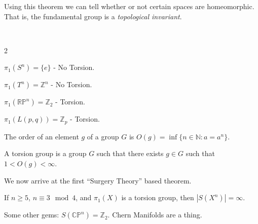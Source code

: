 \documentclass[crop=false,class=book,oneside]{standalone}
\begin{document}
            Using this theorem we can tell whether or not
            certain spaces are homeomorphic. That is,
            the fundamental group is a
            \textit{topological invariant}.
            \begin{example}
                    \
                    \begin{enumerate}
                    \end{enumerate}
                \end{example}
            \begin{definition}
                    The order of an element $g$ of a group $G$
                    is $O(g)=\inf\{n\in\mathbb{N}:a=a^{n}\}$.
                \end{definition}
            \begin{definition}
                    A torsion group is a group $G$ such that
                    there exists $g\in G$ such that $1<O(g)<\infty$.
                \end{definition}
            We now arrive at the first ``Surgery Theory''
            based theorem.
            \begin{theorem}
                If $n\geq 5$, $n\equiv{3}\mod{4}$,
                and $\pi_{1}(X)$ is a torsion group,
                then $|S(X^{n})|=\infty$.
            \end{theorem}
            Some other gems:
            $S(\mathbb{C}\mathbb{P}^{n})=\mathbb{Z}_{2}$.
            Chern Manifolds are a thing.
\end{document}
